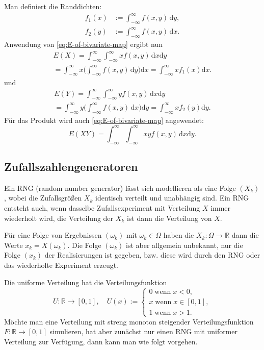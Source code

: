 \documentclass[a4paper,10pt,fleqn,twocolumn,twoside,dvipdfmx]{scrartcl}
\numberwithin{equation}{section}
\newcommand{\R}{\mathbb R}
\theoremstyle{rmbox}
\begin{document}
Man definiert die Randdichten:
\begin{align}
f_1(x) &:= \int_{-\infty}^\infty f(x,y)\,\mathrm dy,\\
f_2(y) &:= \int_{-\infty}^\infty f(x,y)\,\mathrm dx.
\end{align}
Anwendung von \eqref{eq:E-of-bivariate-map} ergibt nun
\begin{gather}
E(X) = \int_{-\infty}^\infty\int_{-\infty}^\infty xf(x,y)\,\mathrm dx\mathrm dy\\
= \int_{-\infty}^\infty x\bigg(\int_{-\infty}^\infty f(x,y)\,\mathrm dy\bigg)\mathrm dx
= \int_{-\infty}^\infty x f_1(x)\mathrm dx.
\end{gather}
und
\begin{gather}
E(Y) = \int_{-\infty}^\infty\int_{-\infty}^\infty yf(x,y)\,\mathrm dx\mathrm dy\\
= \int_{-\infty}^\infty y\bigg(\int_{-\infty}^\infty f(x,y)\,\mathrm dx\bigg)\mathrm dy
= \int_{-\infty}^\infty x f_2(y)\mathrm dy.
\end{gather}
Für das Produkt wird auch \eqref{eq:E-of-bivariate-map} angewendet:
\begin{equation}
E(XY) = \int_{-\infty}^\infty\int_{-\infty}^\infty
xyf(x,y)\,\mathrm dx\mathrm dy.
\end{equation}

\subsection{Zufallszahlengeneratoren}
Ein RNG (random number generator) lässt sich modellieren
als eine Folge $(X_k)$, wobei die Zufallsgrößen $X_k$
identisch verteilt und unabhängig sind. Ein RNG entsteht
auch, wenn dasselbe Zufallsexperiment mit Verteilung $X$ immer
wiederholt wird, die Verteilung der $X_k$ ist dann die Verteilung
von $X$.

Für eine Folge von Ergebnissen $(\omega_k)$ mit
$\omega_k\in\Omega$ haben die $X_k\colon\Omega\to\R$ dann die Werte
$x_k=X(\omega_k)$. Die Folge $(\omega_k)$ ist aber allgemein
unbekannt, nur die Folge $(x_k)$ der Realisierungen ist gegeben,
bzw. diese wird durch den RNG oder das wiederholte Experiment
erzeugt.

Die uniforme Verteilung hat die Verteilungsfunktion%
\begin{equation}
U\colon\R\to [0,1],\quad U(x):=\begin{cases}
0\;\text{wenn}\; x<0,\\
x\;\text{wenn}\; x\in[0,1],\\
1\;\text{wenn}\; x>1.
\end{cases}
\end{equation}
Möchte man eine Verteilung mit streng monoton steigender
Verteilungsfunktion $F\colon\R\to[0,1]$ simulieren, hat aber zunächst
nur einen RNG mit uniformer Verteilung zur Verfügung, dann kann man
wie folgt vorgehen.
\end{document}
